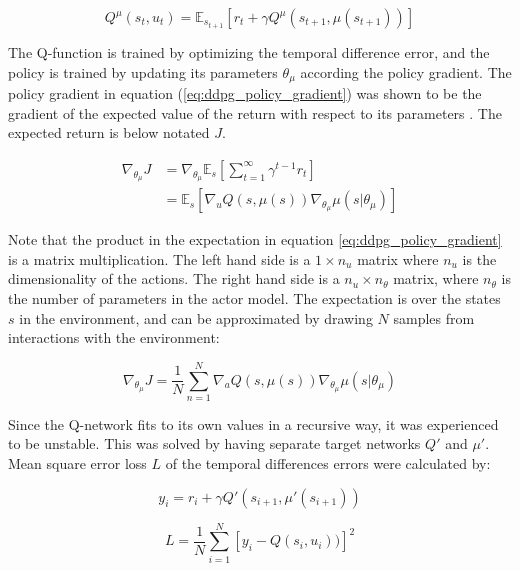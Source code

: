 \begin{equation}
    Q^\mu(s_t, u_t) = \mathbb{E}_{s_{t+1}}\left[ r_t + \gamma Q^\mu(s_{t+1}, \mu (s_{t+1})) \right]
\end{equation}

The Q-function is trained by optimizing the temporal difference error, and the
policy is trained by updating its parameters $\theta_\mu$ according the policy
gradient. The policy gradient in equation (\ref{eq:ddpg_policy_gradient}) was
shown to be the gradient of the expected value of the return with respect to
its parameters \cite{lever2014deterministic}. The expected return is below
notated $J$.

\begin{align}
    \nabla_{\theta_\mu}J &= \nabla_{\theta_\mu} \mathbb{E}_s \left[\sum_{t=1}^\infty \gamma^{t - 1} r_t \right] \\
                         &= \mathbb{E}_s \left[\nabla_u Q(s, \mu(s)) \nabla_{\theta_\mu} \mu(s|\theta_\mu) \right] \label{eq:ddpg_policy_gradient}
\end{align}

Note that the product in the expectation in equation
\ref{eq:ddpg_policy_gradient} is a matrix multiplication. The left hand side is
a $1 \times n_u$ matrix where $n_u$ is the dimensionality of the actions. The
right hand side is a $n_u \times n_\theta$ matrix, where $n_\theta$ is the
number of parameters in the actor model. The expectation is over the states $s$
in the environment, and can be approximated by drawing $N$ samples from
interactions with the environment:

\begin{equation}
    \nabla_{\theta_\mu}J = \frac{1}{N} \sum_{n=1}^N \nabla_a Q(s, \mu(s)) \nabla_{\theta_\mu} \mu(s|\theta_\mu)
\end{equation}

Since the Q-network fits to its own values in a recursive way, it was
experienced to be unstable. This was solved by having separate target networks
$Q'$ and $\mu'$. Mean square error loss $\mathit{L}$ of the temporal
differences errors were calculated by:

\begin{equation}
    y_i = r_i + \gamma Q'(s_{i+1}, \mu'(s_{i+1}))
\end{equation}

\begin{equation}
    \mathit{L} = \frac{1}{N} \sum_{i=1}^N \left[y_i - Q(s_i, u_i)) \right]^2
\end{equation}

